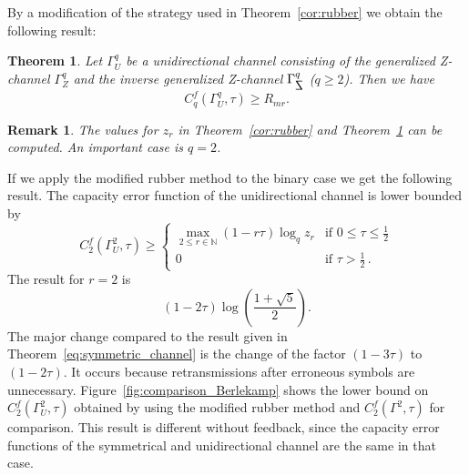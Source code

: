 \documentclass[conference]{IEEEtran}
\def\qed{\hfill $\blacksquare$}
\newtheorem{Theorem}{Theorem}
\newtheorem{Remark}{Remark}
\def\NN{{\mathbb N}}
\begin{document}

%
%	



By a modification of the strategy used in Theorem~\ref{cor:rubber} we obtain the following result:

\begin{Theorem}\label{th:rubber_unidirectional}
	Let $\Gamma_U^q$ be a unidirectional channel consisting of the generalized Z-channel $\Gamma_Z^q$ and the inverse generalized Z-channel $\Gamma_{\reflectbox{$\mathsf{Z}$}}^q$ ($q \geq 2$). Then
	we have 
	\[
	C_q^f(\Gamma_U^q,\tau)\geq R_{mr}.
	\]
\end{Theorem}

\begin{Remark}
The values for $z_r$ in Theorem~\ref{cor:rubber} and Theorem~\ref{th:rubber_unidirectional} 
can be computed. An important case is $q=2$.
\end{Remark}

If we apply the modified rubber method to the binary case we get the following result.
The capacity error function of the unidirectional channel is lower bounded by
    \begin{equation*}
        C_2^f(\Gamma_U^2,\tau) \geq \begin{cases}
	\max\limits_{2\leq r\in\NN} (1-r\tau) \log_q z_r& \text{if } 0 \leq \tau \leq \frac{1}{2}\\
	0 & \text{if } \tau > \frac{1}{2}\, .
	\end{cases}
    \end{equation*}
The result for $r=2$ is
\[
    (1-2\tau)\log \left(\frac{1+\sqrt{5}}{2} \right).
    \]
The major change compared to the result given in Theorem~\ref{eq:symmetric_channel} is the change of the factor $(1-3\tau)$ to $(1-2\tau)$. It occurs because retransmissions after erroneous symbols are unnecessary.
Figure~\ref{fig:comparison_Berlekamp} shows the lower bound on $C_2^f(\Gamma_U^2,\tau)$ obtained by using the modified rubber method and $C_2^f(\Gamma^2,\tau)$ for comparison. This result is different without feedback, since the capacity error functions of the symmetrical and unidirectional channel are the same in that case.
\end{document}

